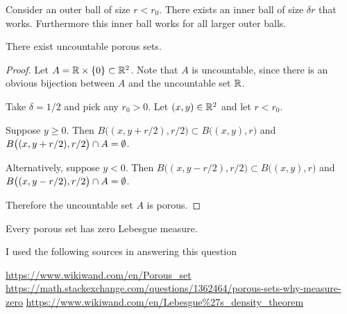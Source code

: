 Consider an outer ball of size $r < r_0$. There exists an inner ball of size $\delta r$ that works. Furthermore
this inner ball works for all larger outer balls.

\begin{claim}
  There exist uncountable porous sets.
\end{claim}

\begin{proof}

  Let $A = \mathbb{R} \times \{0\} \subset \mathbb{R}^2$. Note that $A$ is uncountable, since there is an obvious bijection
  between $A$ and the uncountable set $\mathbb{R}$.

  Take $\delta = 1/2$ and pick any $r_0 > 0$. Let $(x, y) \in \mathbb{R}^2$ and let $r < r_0$.

  Suppose $y \geq 0$. Then $B\big((x, y + r/2), r/2\big) \subset B\big((x, y), r\big)$
  and $B\big((x, y + r/2), r/2\big) \cap A = \emptyset$.

  Alternatively, suppose $y < 0$. Then $B\big((x, y - r/2), r/2\big) \subset B\big((x, y), r\big)$
  and $B\big((x, y - r/2), r/2\big) \cap A = \emptyset$.

  Therefore the uncountable set $A$ is porous.
\end{proof}

\begin{claim}
  Every porous set has zero Lebesgue measure.
\end{claim}

I used the following sources in answering this question

\url{https://www.wikiwand.com/en/Porous_set}
\url{https://math.stackexchange.com/questions/1362464/porous-sets-why-measure-zero}
\url{https://www.wikiwand.com/en/Lebesgue%27s_density_theorem}


